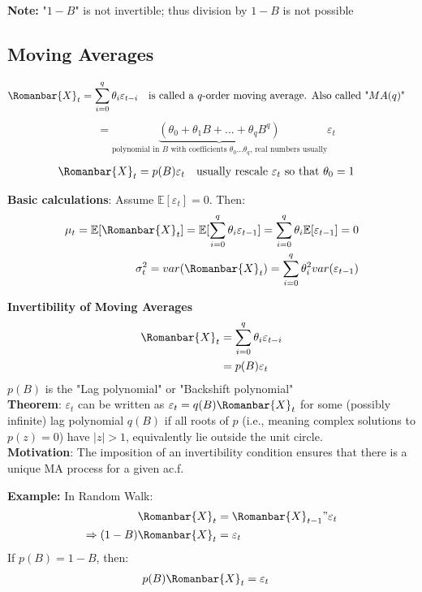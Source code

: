 \textbf{Note:} "$1-B$" is not invertible; thus division by $1-B$ is not possible

\subsection{Moving Averages}

\begin{align*}
  \Romanbar{X}_t&=\sum_{i=0}^q \theta_i\varepsilon_{t-i} &&\text{is called a $q$-order moving average. Also called "$MA(q)$"} 
\end{align*}
\begin{align*}
  &= \underbrace{(\theta_0+\theta_1B+...+\theta_qB^q)}_{\text{polynomial in $B$ with coefficients $\theta_0...\theta_q$, real numbers usually}}\varepsilon_t
\end{align*}
\begin{align*}
  \Romanbar{X}_t&=p(B)\varepsilon_t &&\text{usually rescale $\varepsilon_t$ so that $\theta_0=1$}
\end{align*}

\textbf{Basic calculations}: Assume $\mathbb{E}[\varepsilon_t]=0$. Then: 
\begin{align*}
    \mu_t=\mathbb{E}[\Romanbar{X}_t]=\mathbb{E}[\sum_{i=0}^q \theta_i \varepsilon_{t-1}]=\sum_{i=0}^q \theta_i \mathbb{E}[\varepsilon_{t-1}]=0 \\
\sigma^2_t=var(\Romanbar{X}_t)=\sum_{i=0}^q \theta_i^2 var(\varepsilon_{t-1}) 
\end{align*}

\textbf{Invertibility of Moving Averages}
\begin{align*}
    \Romanbar{X}_t&= \sum_{i=0}^q \theta_i\varepsilon_{t-i}\\
    &=p(B)\varepsilon_t\\
\end{align*}
$p(B)$ is the "Lag polynomial" or "Backshift polynomial"\\

\textbf{Theorem}: $\varepsilon_t$ can be written as $\varepsilon_t=q(B)\Romanbar{X}_t$ for some (possibly infinite) lag polynomial $q(B)$ if all roots of $p$ (i.e., meaning complex solutions to $p(z)=0$) have $|z|>1$, equivalently lie outside the unit circle. \\

\textbf{Motivation}: The imposition of an invertibility condition ensures that there is a unique MA process for a given ac.f.

\textbf{Example:} In Random Walk:
\begin{align*}
    \Romanbar{X}_t&=\Romanbar{X}_{t-1}"\varepsilon_t\\
    \Rightarrow (1-B)\Romanbar{X}_t&=\varepsilon_t
\end{align*}
If $p(B) = 1-B$, then:
\begin{align*}
    p(B)\Romanbar{X}_t&=\varepsilon_t
\end{align*}


